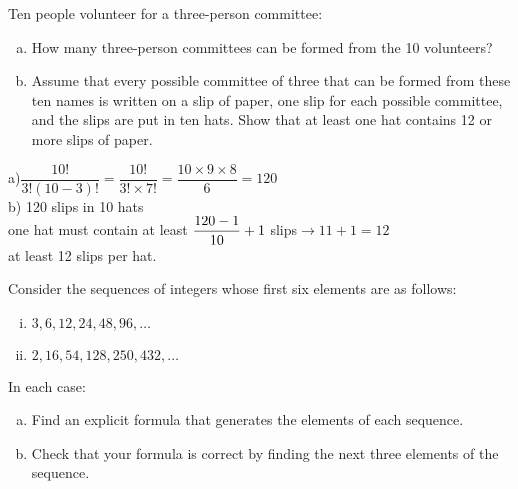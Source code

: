 \documentclass[addpoints,10pt,answers]{exam}
\begin{document}
\begin{questions}



\question[12] 
Ten people volunteer for a three-person committee:
\begin{enumerate}[(a)]
\item 
How many three-person committees can be formed from the 10 volunteers? 
\item 
Assume that every possible committee of three that can be formed from these ten names is written on a slip of paper, one slip for each possible committee, and the slips are put in ten hats. Show that at least one hat contains 12 or more slips of paper.
\end{enumerate}

\begin{solution}
a)$\dfrac{10!}{3!(10-3)!}=\dfrac{10!}{3!\times 7!}=\dfrac{10\times 9\times 8}{6}=120$\\
b) 120 slips in 10 hats \\ one hat must contain at least $\dfrac{120-1}{10}+1\hspace{1mm}$slips$\rightarrow11+1=12$\\ at least 12 slips per hat.
\end{solution}


\question[12] Consider the sequences of integers whose first six elements are as follows:
\begin{enumerate}[(i)]
\item 
$3,6,12,24,48,96, \ldots$
\item 
$2,16,54,128,250, 432, \ldots$
\end{enumerate}

In each case:
\begin{enumerate}[(a)]
\item 
Find an explicit formula that generates the elements of each sequence.
\item 
Check that your formula is correct by finding the next three elements of the sequence.
\end{enumerate}


\end{questions}
\end{document}
